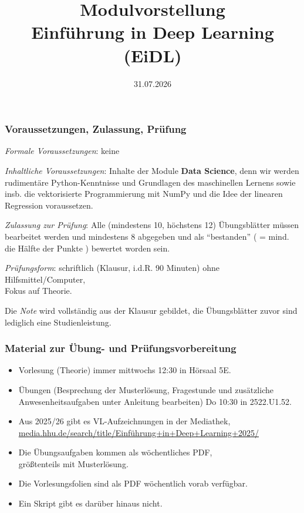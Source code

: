 

\title{Modulvorstellung \\Einführung in Deep Learning (EiDL)}
\date{31.07.2026}




\begin{frame}
  \titlepage
\end{frame}

\begin{frame}
  \frametitle{Voraussetzungen, Zulassung, Prüfung}

  \emph{Formale Voraussetzungen}: keine

  \emph{Inhaltliche Voraussetzungen}:  Inhalte der Module \textbf{Data Science}, denn wir werden rudimentäre Python-Kenntnisse und Grundlagen des maschinellen Lernens sowie insb. die vektorisierte Programmierung mit NumPy und die Idee der linearen Regression voraussetzen.

  \emph{Zulassung zur Prüfung}: Alle (mindestens 10, höchstens 12) Übungsblätter müssen bearbeitet werden und mindestens 8 abgegeben und als ``bestanden'' ( = mind. die Hälfte der Punkte ) bewertet worden sein.

  \emph{Prüfungsform}: schriftlich (Klausur, i.d.R. 90 Minuten) ohne Hilfsmittel/Computer,\\
  Fokus auf Theorie.

  Die \emph{Note} wird vollständig aus der Klausur gebildet, die Übungsblätter zuvor sind lediglich eine Studienleistung.
  
\end{frame}

\begin{frame}
  \frametitle{Material zur Übung- und Prüfungsvorbereitung}

  \begin{itemize}
  \item Vorlesung (Theorie) immer mittwochs 12:30 in Hörsaal 5E.
    \item Übungen (Besprechung der Musterlösung, Fragestunde und zusätzliche Anwesenheitsaufgaben unter Anleitung bearbeiten) Do 10:30 in 2522.U1.52.
\item  Aus 2025/26 gibt es VL-Aufzeichnungen in der Mediathek,\\
  \url{media.hhu.de/search/title/Einführung+in+Deep+Learning+2025/}
\item  Die Übungsaufgaben kommen als wöchentliches PDF,\\größtenteils mit Musterlösung.
\item  Die Vorlesungsfolien sind als PDF wöchentlich vorab verfügbar.
\item Ein Skript gibt es darüber hinaus nicht.
\end{itemize}
\end{frame}

